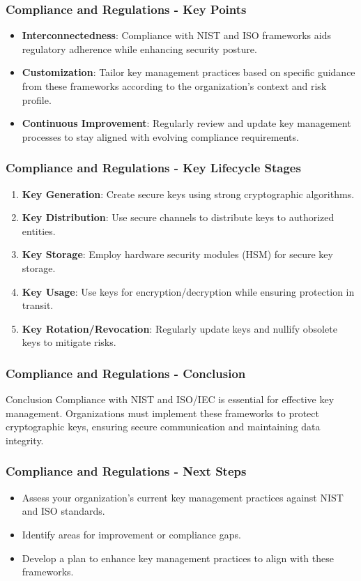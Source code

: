 \documentclass{beamer}
\begin{document}
\begin{frame}[fragile]
    \frametitle{Compliance and Regulations - Key Points}
    \begin{itemize}
        \item \textbf{Interconnectedness}: Compliance with NIST and ISO frameworks aids regulatory adherence while enhancing security posture.
        \item \textbf{Customization}: Tailor key management practices based on specific guidance from these frameworks according to the organization's context and risk profile.
        \item \textbf{Continuous Improvement}: Regularly review and update key management processes to stay aligned with evolving compliance requirements.
    \end{itemize}
\end{frame}

\begin{frame}[fragile]
    \frametitle{Compliance and Regulations - Key Lifecycle Stages}
    \begin{enumerate}
        \item \textbf{Key Generation}: Create secure keys using strong cryptographic algorithms.
        \item \textbf{Key Distribution}: Use secure channels to distribute keys to authorized entities.
        \item \textbf{Key Storage}: Employ hardware security modules (HSM) for secure key storage.
        \item \textbf{Key Usage}: Use keys for encryption/decryption while ensuring protection in transit.
        \item \textbf{Key Rotation/Revocation}: Regularly update keys and nullify obsolete keys to mitigate risks.
    \end{enumerate}
\end{frame}

\begin{frame}[fragile]
    \frametitle{Compliance and Regulations - Conclusion}
    \begin{block}{Conclusion}
        Compliance with NIST and ISO/IEC is essential for effective key management. Organizations must implement these frameworks to protect cryptographic keys, ensuring secure communication and maintaining data integrity.
    \end{block}
\end{frame}

\begin{frame}[fragile]
    \frametitle{Compliance and Regulations - Next Steps}
    \begin{itemize}
        \item Assess your organization’s current key management practices against NIST and ISO standards.
        \item Identify areas for improvement or compliance gaps.
        \item Develop a plan to enhance key management practices to align with these frameworks.
    \end{itemize}
\end{frame}
\end{document}
